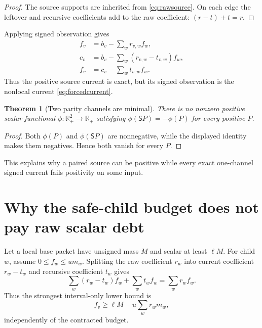 \documentclass[11pt]{article}
\newtheorem{theorem}{Theorem}[section]
\newcommand{\R}{\mathbb R}
\newcommand{\1}{\mathbf 1}
\begin{document}
\begin{proof}
The source supports are inherited from \eqref{eq:rawsource}.  On each edge the
leftover and recursive coefficients add to the raw coefficient:
$(r-t)+t=r$.
\end{proof}

Applying signed observation gives
\begin{align}
 f_v&=b_v-\sum_wr_{v,w}f_w,\label{eq:signedraw}\\
 c_v&=b_v-\sum_w(r_{v,w}-t_{v,w})f_w,\label{eq:signedcurrent}\\
 f_v&=c_v-\sum_wt_{v,w}f_w.\label{eq:signedcontracted}
\end{align}
Thus the positive source current is exact, but its signed observation is the
nonlocal current \eqref{eq:forcedcurrent}.

\begin{theorem}[Two parity channels are minimal]
There is no nonzero positive scalar functional $\phi:\R_+^2\to\R_+$ satisfying
$\phi(\mathsf SP)=-\phi(P)$ for every positive $P$.
\end{theorem}

\begin{proof}
Both $\phi(P)$ and $\phi(\mathsf SP)$ are nonnegative, while the displayed
identity makes them negatives.  Hence both vanish for every $P$.
\end{proof}

This explains why a paired source can be positive while every exact
one-channel signed current fails positivity on some input.

\section{Why the safe-child budget does not pay raw scalar debt}

Let a local base packet have unsigned mass $M$ and scalar at least $\ell M$.
For child $w$, assume $0\le f_w\le u m_w$.  Splitting the raw coefficient
$r_w$ into current coefficient $r_w-t_w$ and recursive coefficient $t_w$ gives
\begin{equation}
 \sum_w(r_w-t_w)f_w+\sum_wt_wf_w=\sum_wr_wf_w.
 \label{eq:exposure}
\end{equation}
Thus the strongest interval-only lower bound is
\begin{equation}
 \boxed{
 f_v\ge \ell M-u\sum_wr_wm_w,
 }
 \label{eq:rawbound}
\end{equation}
independently of the contracted budget.
\end{document}
